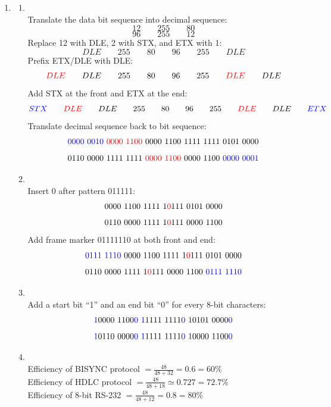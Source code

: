 \documentclass[10pt, a4paper]{article}
\begin{document}
\begin{enumerate}
\item\mbox{}
    \begin{enumerate}
    \item\mbox{}\\
        Translate the data bit sequence into decimal sequence:
        $$12\qquad 255\qquad 80$$
        $$96\qquad 255\qquad 12$$
        Replace 12 with DLE, 2 with STX, and ETX with 1:
        $$DLE\qquad 255\qquad 80\qquad 96\qquad 255\qquad DLE$$
        Prefix ETX/DLE with DLE:\@
        $$\textcolor{red}{DLE}\qquad DLE\qquad 255\qquad 80\qquad 96\qquad 255\qquad \textcolor{red}{DLE}\qquad DLE$$
        Add STX at the front and ETX at the end:
        $$\textcolor{blue}{STX}\qquad \textcolor{red}{DLE}\qquad DLE\qquad 255\qquad 80\qquad 96\qquad 255\qquad \textcolor{red}{DLE}\qquad DLE\qquad \textcolor{blue}{ETX}$$
        Translate decimal sequence back to bit sequence:
        $$\textcolor{blue}{0000\ 0010}\ \textcolor{red}{0000\ 1100}\ 0000\ 1100\ 1111\ 1111\ 0101\ 0000$$
        $$0110\ 0000\ 1111\ 1111\ \textcolor{red}{0000\ 1100}\ 0000\ 1100\ \textcolor{blue}{0000\ 0001}$$
    \item\mbox{}\\
        Insert 0 after pattern 011111:
        $$0000\ 1100\ 1111\ 1\textcolor{red}{0}111\ 0101\ 0000$$
        $$0110\ 0000\ 1111\ 1\textcolor{red}{0}111\ 0000\ 1100$$
        Add frame marker 01111110 at both front and end:
        $$\textcolor{blue}{0111\ 1110}\ 0000\ 1100\ 1111\ 1\textcolor{red}{0}111\ 0101\ 0000$$
        $$0110\ 0000\ 1111\ 1\textcolor{red}{0}111\ 0000\ 1100\ \textcolor{blue}{0111\ 1110}$$
    \item\mbox{}\\
        Add a start bit ``1'' and an end bit ``0'' for every 8-bit characters:
        $$\textcolor{blue}{1}0000\ 1100\textcolor{blue}{0}\ \textcolor{blue}{1}1111\ 1111\textcolor{blue}{0}\ \textcolor{blue}{1}0101\ 0000\textcolor{blue}{0}$$
        $$\textcolor{blue}{1}0110\ 0000\textcolor{blue}{0}\ \textcolor{blue}{1}1111\ 1111\textcolor{blue}{0}\ \textcolor{blue}{1}0000\ 1100\textcolor{blue}{0}$$
    \item\mbox{}\\
        Efficiency of BISYNC protocol $= \frac{48}{48 + 32} = 0.6 = 60 \%$\\
        Efficiency of HDLC protocol $= \frac{48}{48 + 18} \simeq 0.727 = 72.7 \%$\\
        Efficiency of 8-bit RS-232 $= \frac{48}{48 + 12} = 0.8 = 80 \%$
    \end{enumerate}


\end{enumerate}
\end{document}

